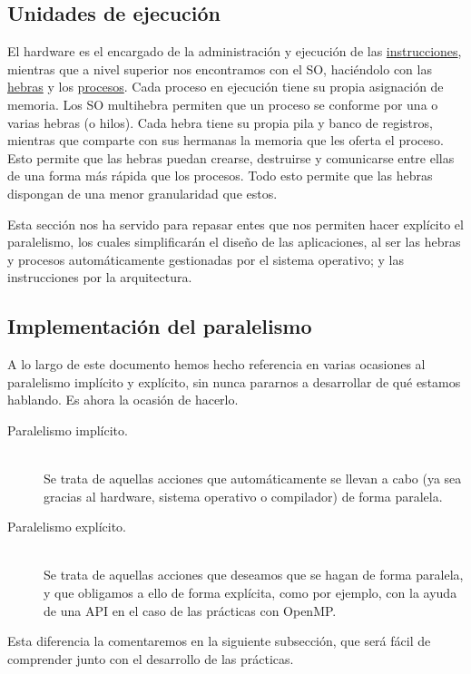 \subsection{Unidades de ejecución}
El hardware es el encargado de la administración y ejecución de las \ul{instrucciones}, mientras que a nivel superior nos encontramos con el SO, haciéndolo con las \ul{hebras} y los \ul{procesos}. Cada proceso en ejecución tiene su propia asignación de memoria. Los SO multihebra permiten que un proceso se conforme por una o varias hebras (o hilos). Cada hebra tiene su propia pila y banco de registros, mientras que comparte con sus hermanas la memoria que les oferta el proceso. Esto permite que las hebras puedan crearse, destruirse y comunicarse entre ellas de una forma más rápida que los procesos. Todo esto permite que las hebras dispongan de una menor granularidad que estos. 

Esta sección nos ha servido para repasar entes que nos permiten hacer explícito el paralelismo, los cuales simplificarán el diseño de las aplicaciones, al ser las hebras y procesos automáticamente gestionadas por el sistema operativo; y las instrucciones por la arquitectura.

\subsection{Implementación del paralelismo}
A lo largo de este documento hemos hecho referencia en varias ocasiones al paralelismo implícito y explícito, sin nunca pararnos a desarrollar de qué estamos hablando. Es ahora la ocasión de hacerlo.
\begin{description}
    \item [Paralelismo implícito.]~\\
        Se trata de aquellas acciones que automáticamente se llevan a cabo (ya sea gracias al hardware, sistema operativo o compilador) de forma paralela.

    \item [Paralelismo explícito.]~\\
        Se trata de aquellas acciones que deseamos que se hagan de forma paralela, y que obligamos a ello de forma explícita, como por ejemplo, con la ayuda de una API en el caso de las prácticas con OpenMP.
\end{description}
Esta diferencia la comentaremos en la siguiente subsección, que será fácil de comprender junto con el desarrollo de las prácticas.

